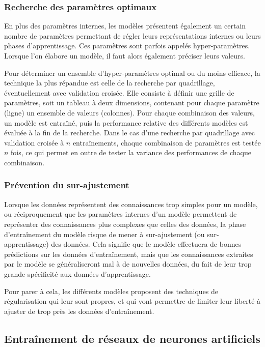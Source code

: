 \subsubsection{Recherche des paramètres optimaux}
\par En plus des paramètres internes, les modèles présentent également un certain nombre de paramètres permettant de régler leurs représentations internes ou leurs phases d'apprentissage. Ces paramètres sont parfois appelés hyper-paramètres. Lorsque l'on élabore un modèle, il faut alors également préciser leurs valeurs.\\
\par Pour déterminer un ensemble d'hyper-paramètres optimal ou du moins efficace, la technique la plus répandue est celle de la recherche par quadrillage, éventuellement avec validation croisée. Elle consiste à définir une grille de paramètres, soit un tableau à deux dimensions, contenant pour chaque paramètre (ligne) un ensemble de valeurs (colonnes). Pour chaque combinaison des valeurs, un modèle est entraîné, puis la performance relative des différents modèles est évaluée à la fin de la recherche. Dans le cas d'une recherche par quadrillage avec validation croisée à $n$ entraînements, chaque combinaison de paramètres est testée $n$ fois, ce qui permet en outre de tester la variance des performances de chaque combinaison.

\subsubsection{Prévention du sur-ajustement}
\par Lorsque les données représentent des connaissances trop simples pour un modèle, ou réciproquement que les paramètres internes d'un modèle permettent de représenter des connaissances plus complexes que celles des données, la phase d'entraînement du modèle risque de mener à sur-ajustement (ou sur-apprentissage) des données. Cela signifie que le modèle effectuera de bonnes prédictions sur les données d'entraînement, mais que les connaissances extraites par le modèle se généraliseront mal à de nouvelles données, du fait de leur trop grande spécificité aux données d'apprentissage.\\
\par Pour parer à cela, les différents modèles proposent des techniques de régularisation qui leur sont propres, et qui vont permettre de limiter leur liberté à ajuster de trop près les données d'entraînement.


\subsection{Entraînement de réseaux de neurones artificiels}

